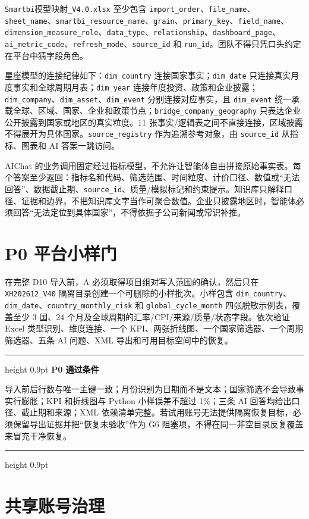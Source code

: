 \documentclass[UTF8,fontset=windows,12pt,openany]{ctexbook}
\newenvironment{gatebox}[1][]{%
  \par\medskip\noindent\begin{center}\begin{minipage}{0.93\textwidth}%
  \color{GoldLine}\hrule height 0.9pt\vspace{0.45em}%
  \textbf{#1}\par\smallskip\color{black}%
}{%
  \par\vspace{0.35em}\color{GoldLine}\hrule height 0.9pt%
  \end{minipage}\end{center}\medskip%
}
\newcommand{\Field}[1]{{\small\nolinkurl{#1}}}
\newcommand{\File}[1]{{\small\nolinkurl{#1}}}
\begin{document}
\File{Smartbi}\textsf{模型映射}\File{_V4.0.xlsx} 至少包含 \Field{import_order}、\Field{file_name}、\Field{sheet_name}、\Field{smartbi_resource_name}、\Field{grain}、\Field{primary_key}、\Field{field_name}、\Field{dimension_measure_role}、\Field{data_type}、\Field{relationship}、\Field{dashboard_page}、\Field{ai_metric_code}、\Field{refresh_mode}、\Field{source_id} 和 \Field{run_id}。团队不得只凭口头约定在平台中猜字段角色。

星座模型的连接纪律如下：\Field{dim_country} 连接国家事实；\Field{dim_date} 只连接真实月度事实和全球周期月表；\Field{dim_year} 连接年度投资、政策和企业披露；\Field{dim_company}、\Field{dim_asset}、\Field{dim_event} 分别连接对应事实，且 \Field{dim_event} 统一承载全球、区域、国家、企业和政策节点；\Field{bridge_company_geography} 只表达企业公开披露到国家或地区的真实粒度。11 张事实/逻辑表之间不直接连接，区域披露不得展开为具体国家。\Field{source_registry} 作为追溯参考对象，由 \Field{source_id} 从指标、图表和 AI 答案一跳访问。

AIChat 的业务调用固定经过指标模型，不允许让智能体自由拼接原始事实表。每个答案至少返回：指标名和代码、筛选范围、时间粒度、计价口径、数值或“无法回答”、数据截止期、\Field{source_id}、质量/模拟标记和约束提示。知识库只解释口径、证据和边界，不把知识库文字当作可聚合数值。企业只披露地区时，智能体必须回答“无法定位到具体国家”，不得依据子公司新闻或常识补推。

\section{P0 平台小样门}

在完整 D10 导入前，A 必须取得项目组对写入范围的确认，然后只在 \Field{XH202612_V40} 隔离目录创建一个可删除的小样批次。小样包含 \Field{dim_country}、\Field{dim_date}、\Field{country_monthly_risk} 和 \Field{global_cycle_month} 四张脱敏示例表，覆盖至少 3 国、24 个月及全球周期的汇率/CPI/来源/质量/状态字段。依次验证 Excel 类型识别、维度连接、一个 KPI、两张折线图、一个国家筛选器、一个周期筛选器、五条 AI 问题、XML 导出和可用目标空间中的恢复。

\begin{gatebox}[P0 通过条件]
导入前后行数与唯一主键一致；月份识别为日期而不是文本；国家筛选不会导致事实行膨胀；KPI 和折线图与 Python 小样误差不超过 1\%；三条 AI 回答均给出口径、截止期和来源；XML 依赖清单完整。若试用账号无法提供隔离恢复目标，必须保留导出证据并把“恢复未验收”作为 G6 阻塞项，不得在同一非空目录反复覆盖来冒充干净恢复。
\end{gatebox}

\section{共享账号治理}
\end{document}
